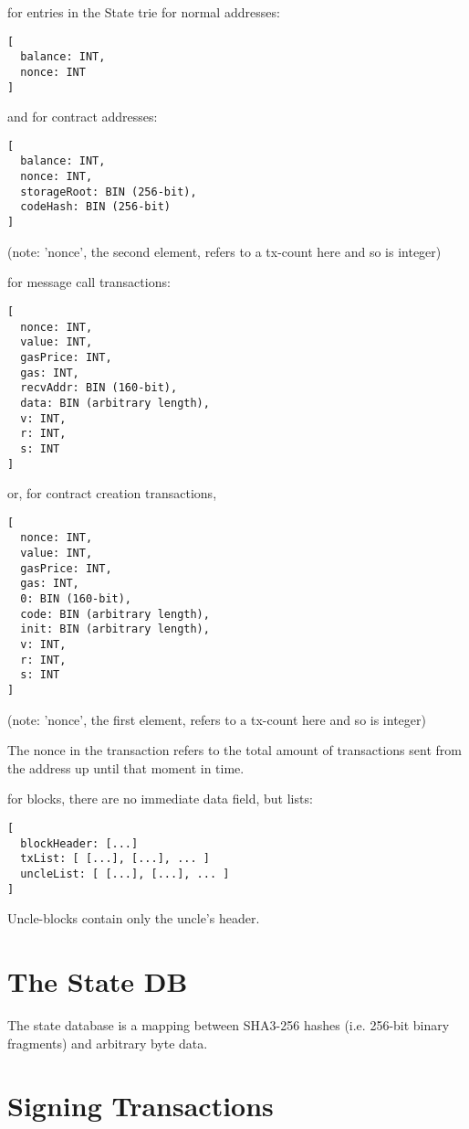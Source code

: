 \documentclass[9pt,oneside]{amsart}
\begin{document}
for entries in the State trie for normal addresses:
\begin{verbatim}
[
  balance: INT,
  nonce: INT
]
\end{verbatim}

and for contract addresses:
\begin{verbatim}
[
  balance: INT,
  nonce: INT,
  storageRoot: BIN (256-bit),
  codeHash: BIN (256-bit)
]
\end{verbatim}

(note: 'nonce', the second element, refers to a tx-count here and so is integer)

for message call transactions:

\begin{verbatim}
[
  nonce: INT,
  value: INT,
  gasPrice: INT,
  gas: INT,
  recvAddr: BIN (160-bit),
  data: BIN (arbitrary length),
  v: INT,
  r: INT,
  s: INT
]
\end{verbatim}

or, for contract creation transactions,

\begin{verbatim}
[
  nonce: INT,
  value: INT,
  gasPrice: INT,
  gas: INT,
  0: BIN (160-bit),
  code: BIN (arbitrary length),
  init: BIN (arbitrary length),
  v: INT,
  r: INT,
  s: INT
]
\end{verbatim}

(note: 'nonce', the first element, refers to a tx-count here and so is integer)

The nonce in the transaction refers to the total amount of transactions sent from the address up until that moment in time.

for blocks, there are no immediate data field, but lists:

\begin{verbatim}
[
  blockHeader: [...]
  txList: [ [...], [...], ... ]
  uncleList: [ [...], [...], ... ]
]
\end{verbatim}

Uncle-blocks contain only the uncle's header.

\section{The State DB}\label{app:state}

The state database is a mapping between SHA3-256 hashes (i.e. 256-bit binary fragments) and arbitrary byte data.

\section{Signing Transactions}\label{app:signing}
\end{document}
